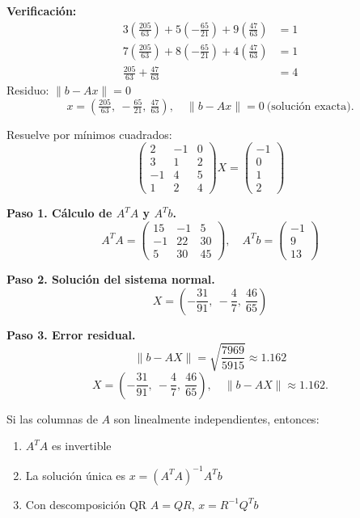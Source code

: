 \begin{example}
\begin{myproof}
\textbf{Verificación:}
\begin{align*}
3\left(\frac{205}{63}\right) + 5\left(-\frac{65}{21}\right) + 9\left(\frac{47}{63}\right) &= 1 \\
7\left(\frac{205}{63}\right) + 8\left(-\frac{65}{21}\right) + 4\left(\frac{47}{63}\right) &= 1 \\
\frac{205}{63} + \frac{47}{63} &= 4
\end{align*}
Residuo: $\|b - Ax\| = 0$
$$\boxed{x = \left(\tfrac{205}{63},\ -\tfrac{65}{21},\ \tfrac{47}{63}\right),\quad \|b - Ax\| = 0\ \text{(solución exacta).}}$$
\end{myproof}
\end{example}

\begin{example}
Resuelve por mínimos cuadrados:
\[
\begin{pmatrix}
2 & -1 & 0 \\
3 & 1 & 2 \\
-1 & 4 & 5 \\
1 & 2 & 4
\end{pmatrix}
X =
\begin{pmatrix} -1 \\ 0 \\ 1 \\ 2 \end{pmatrix}
\]
\begin{myproof}
\textbf{Paso 1. Cálculo de $A^T A$ y $A^T b$.}
\[
A^T A = \begin{pmatrix}
15 & -1 & 5 \\
-1 & 22 & 30 \\
5 & 30 & 45
\end{pmatrix}, \quad
A^T b = \begin{pmatrix} -1 \\ 9 \\ 13 \end{pmatrix}
\]

\textbf{Paso 2. Solución del sistema normal.}
\[
X = \left( -\dfrac{31}{91},\ -\dfrac{4}{7},\ \dfrac{46}{65} \right)
\]

\textbf{Paso 3. Error residual.}
\[
\|b - AX\| = \sqrt{\frac{7969}{5915}} \approx 1.162
\]
$$\boxed{X = \left(-\dfrac{31}{91},\ -\dfrac{4}{7},\ \dfrac{46}{65}\right),\quad \|b - AX\| \approx 1.162.}$$
\end{myproof}
\end{example}

\begin{theorem}
Si las columnas de $A$ son linealmente independientes, entonces:
\begin{enumerate}
    \item $A^T A$ es invertible
    \item La solución única es $x = (A^T A)^{-1} A^T b$
    \item Con descomposición QR $A = QR$, $x = R^{-1} Q^T b$
\end{enumerate}
\end{theorem}

